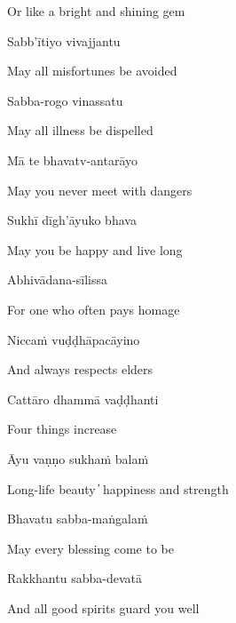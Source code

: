 \begin{cprenglish}
  Or like a bright and shining gem\\
\end{cprenglish}

Sabb'ītiyo vivajjantu

\begin{cprenglish}
  May all misfortunes be avoided
\end{cprenglish}

Sabba-rogo vinassatu

\begin{cprenglish}
  May all illness be dispelled
\end{cprenglish}

Mā te bhavatv-antarāyo

\begin{cprenglish}
  May you never meet with dangers
\end{cprenglish}

Sukhī dīgh'āyuko bhava

\begin{cprenglish}
  May you be happy and live long
\end{cprenglish}

Abhivādana-sīlissa

\begin{cprenglish}
For one who often pays homage
\end{cprenglish}

Niccaṁ vuḍḍhāpacāyino

\begin{cprenglish}
And always respects elders
\end{cprenglish}

Cattāro dhammā vaḍḍhanti

\begin{cprenglish}
Four things increase
\end{cprenglish}

Āyu vaṇṇo sukhaṁ balaṁ

\begin{cprenglish}
Long-life beauty  ̓  happiness and strength
\end{cprenglish}

Bhavatu sabba-maṅgalaṁ

\begin{cprenglish}
  May every blessing come to be
\end{cprenglish}

Rakkhantu sabba-devatā

\begin{cprenglish}
  And all good spirits guard you well
\end{cprenglish}

